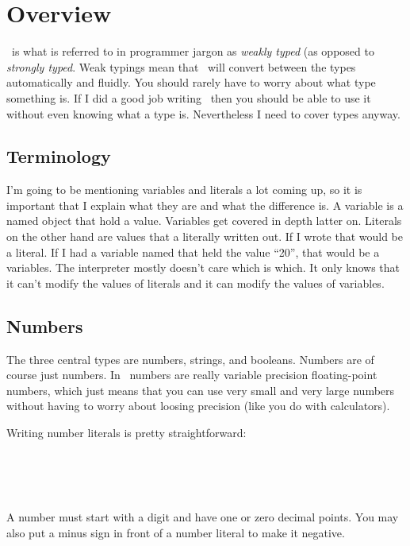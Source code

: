 \section{Overview}

\SSquared\ is what is referred to in programmer jargon as \emph{weakly typed} (as opposed to \emph{strongly typed}.  Weak typings mean that \SSquared\ will convert between the types automatically and fluidly.  You should rarely have to worry about what type something is.  If I did a good job writing \SSquared\ then you should be able to use it without even knowing what a type is.  Nevertheless I need to cover types anyway.  

\subsection{Terminology}
I'm going to be mentioning variables and literals a lot coming up, so it is important that I explain what they are and what the difference is.  A variable is a named object that hold a value.  Variables get covered in depth latter on.  Literals on the other hand are values that a literally written out.  If I wrote  that would be a literal.  If I had a variable named  that held the value ``20'', that would be a variables.  The interpreter mostly doesn't care which is which.  It only knows that it can't modify the values of literals and it can modify the values of variables.

\subsection{Numbers}
The three central types are numbers, strings, and booleans.  Numbers are of course just numbers.  In \SSquared\ numbers are really variable precision floating-point numbers, which just means that you can use very small and very large numbers without having to worry about loosing precision (like you do with calculators).  

Writing number literals is pretty straightforward:

\begin{SSCodeBox}
 \\
 \\
 \\
\end{SSCodeBox}

A number must start with a digit and have one or zero decimal points.   You may also put a minus sign in front of a number literal to make it negative.

